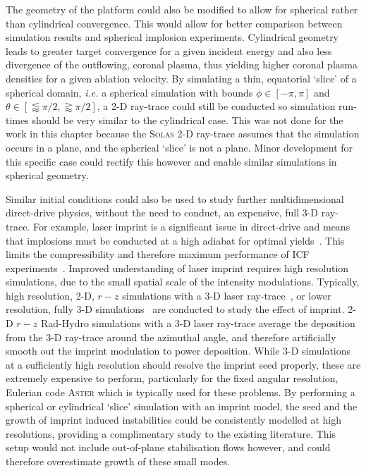 The geometry of the platform could also be modified to allow for spherical rather than cylindrical convergence.
This would allow for better comparison between simulation results and spherical implosion experiments.
Cylindrical geometry leads to greater target convergence for a given incident energy and also less divergence of the outflowing, coronal plasma, thus yielding higher coronal plasma densities for a given ablation velocity.
By simulating a thin, equatorial `slice' of a spherical domain, \textit{i.e.} a spherical simulation with bounds $\phi\in[-\pi,\pi]$ and $\theta\in\left[\lessapprox\pi/2,\gtrapprox\pi/2\right]$, a 2-D ray-trace could still be conducted so simulation run-times should be very similar to the cylindrical case.
This was not done for the work in this chapter because the \textsc{Solas} 2-D ray-trace assumes that the simulation occurs in a plane, and the spherical `slice' is not a plane.
Minor development for this specific case could rectify this however and enable similar simulations in spherical geometry.

Similar initial conditions could also be used to study further multidimensional direct-drive physics, without the need to conduct, an expensive, full 3-D ray-trace.
For example, laser imprint is a significant issue in direct-drive and means that implosions must be conducted at a high adiabat for optimal yields~\cite{patel_effects_2023}.
This limits the compressibility and therefore maximum performance of \ac{ICF} experiments~\cite{dittrich_design_2014,robey_performance_2016}.
Improved understanding of laser imprint requires high resolution simulations, due to the small spatial scale of the intensity modulations.
Typically, high resolution, 2-D, $r-z$ simulations with a 3-D laser ray-trace~\cite{hu_direct-drive_2019}, or lower resolution, fully 3-D simulations~\cite{igumenshchev_rarefaction_2019} are conducted to study the effect of imprint.
2-D $r-z$ \ac{Rad-Hydro} simulations with a 3-D laser ray-trace average the deposition from the 3-D ray-trace around the azimuthal angle, and therefore artificially smooth out the imprint modulation to power deposition.
While 3-D simulations at a sufficiently high resolution should resolve the imprint seed properly, these are extremely expensive to perform, particularly for the fixed angular resolution, Eulerian code \textsc{Aster} which is typically used for these problems.
By performing a spherical or cylindrical `slice' simulation with an imprint model, the seed and the growth of imprint induced instabilities could be consistently modelled at high resolutions, providing a complimentary study to the existing literature.
This setup would not include out-of-plane stabilisation flows however, and could therefore overestimate growth of these small modes.
